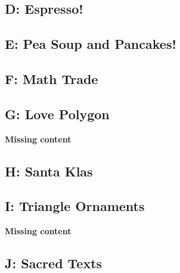 \documentclass{article}
\begin{document}


\subsection{D: Espresso!}



\subsection{E: Pea Soup and Pancakes!}



\subsection{F: Math Trade}



\subsection{G: Love Polygon}

\textbf{Missing content}

% 

\subsection{H: Santa Klas}



\subsection{I: Triangle Ornaments}

\textbf{Missing content}

% 

\subsection{J: Sacred Texts}
\end{document}
